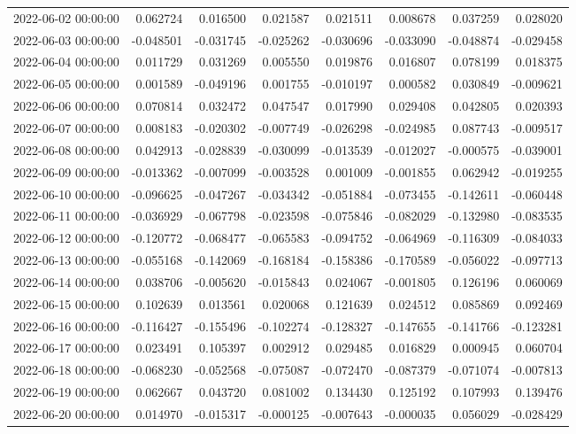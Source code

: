 \begin{tabular}{lrrrrrrr}
2022-06-02 00:00:00 & 0.062724 & 0.016500 & 0.021587 & 0.021511 & 0.008678 & 0.037259 & 0.028020 \\
2022-06-03 00:00:00 & -0.048501 & -0.031745 & -0.025262 & -0.030696 & -0.033090 & -0.048874 & -0.029458 \\
2022-06-04 00:00:00 & 0.011729 & 0.031269 & 0.005550 & 0.019876 & 0.016807 & 0.078199 & 0.018375 \\
2022-06-05 00:00:00 & 0.001589 & -0.049196 & 0.001755 & -0.010197 & 0.000582 & 0.030849 & -0.009621 \\
2022-06-06 00:00:00 & 0.070814 & 0.032472 & 0.047547 & 0.017990 & 0.029408 & 0.042805 & 0.020393 \\
2022-06-07 00:00:00 & 0.008183 & -0.020302 & -0.007749 & -0.026298 & -0.024985 & 0.087743 & -0.009517 \\
2022-06-08 00:00:00 & 0.042913 & -0.028839 & -0.030099 & -0.013539 & -0.012027 & -0.000575 & -0.039001 \\
2022-06-09 00:00:00 & -0.013362 & -0.007099 & -0.003528 & 0.001009 & -0.001855 & 0.062942 & -0.019255 \\
2022-06-10 00:00:00 & -0.096625 & -0.047267 & -0.034342 & -0.051884 & -0.073455 & -0.142611 & -0.060448 \\
2022-06-11 00:00:00 & -0.036929 & -0.067798 & -0.023598 & -0.075846 & -0.082029 & -0.132980 & -0.083535 \\
2022-06-12 00:00:00 & -0.120772 & -0.068477 & -0.065583 & -0.094752 & -0.064969 & -0.116309 & -0.084033 \\
2022-06-13 00:00:00 & -0.055168 & -0.142069 & -0.168184 & -0.158386 & -0.170589 & -0.056022 & -0.097713 \\
2022-06-14 00:00:00 & 0.038706 & -0.005620 & -0.015843 & 0.024067 & -0.001805 & 0.126196 & 0.060069 \\
2022-06-15 00:00:00 & 0.102639 & 0.013561 & 0.020068 & 0.121639 & 0.024512 & 0.085869 & 0.092469 \\
2022-06-16 00:00:00 & -0.116427 & -0.155496 & -0.102274 & -0.128327 & -0.147655 & -0.141766 & -0.123281 \\
2022-06-17 00:00:00 & 0.023491 & 0.105397 & 0.002912 & 0.029485 & 0.016829 & 0.000945 & 0.060704 \\
2022-06-18 00:00:00 & -0.068230 & -0.052568 & -0.075087 & -0.072470 & -0.087379 & -0.071074 & -0.007813 \\
2022-06-19 00:00:00 & 0.062667 & 0.043720 & 0.081002 & 0.134430 & 0.125192 & 0.107993 & 0.139476 \\
2022-06-20 00:00:00 & 0.014970 & -0.015317 & -0.000125 & -0.007643 & -0.000035 & 0.056029 & -0.028429 \\

\end{tabular}
